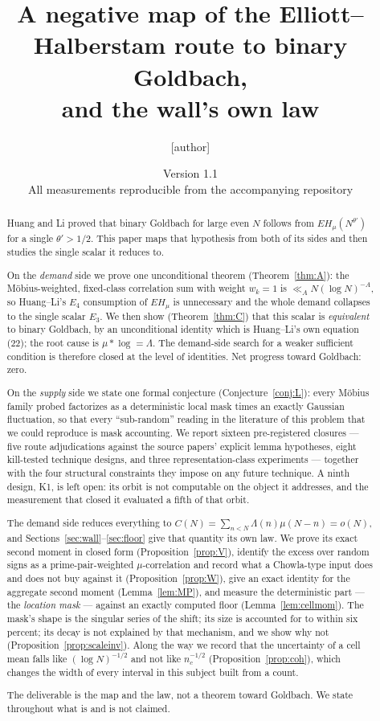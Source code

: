\documentclass[11pt,a4paper]{article}
\title{A negative map of the Elliott--Halberstam route to binary
Goldbach,\\ and the wall's own law}
\author{[author]}
\date{Version 1.1\\
\small All measurements reproducible from the accompanying repository}
\theoremstyle{plain}
\theoremstyle{definition}
\begin{document}
\maketitle

\begin{abstract}
Huang and Li proved that binary Goldbach for large even $N$ follows
from $EH_\mu(N^{\theta'})$ for a single $\theta' > 1/2$. This paper
maps that hypothesis from both of its sides and then studies the
single scalar it reduces to.

On the \emph{demand} side we prove one unconditional theorem
(Theorem~\ref{thm:A}): the M\"obius-weighted, fixed-class correlation
sum with weight $w_k = 1$ is $\ll_A N(\log N)^{-A}$, so Huang--Li's
$E_4$ consumption of $EH_\mu$ is unnecessary and the whole demand
collapses to the single scalar $E_3$. We then show
(Theorem~\ref{thm:C}) that this scalar is \emph{equivalent} to binary
Goldbach, by an unconditional identity which is Huang--Li's own
equation (22); the root cause is $\mu * \log = \Lambda$. The
demand-side search for a weaker sufficient condition is therefore
closed at the level of identities. Net progress toward Goldbach: zero.

On the \emph{supply} side we state one formal conjecture
(Conjecture~\ref{conj:L}): every M\"obius family probed factorizes as
a deterministic local mask times an exactly Gaussian fluctuation, so
that every ``sub-random'' reading in the literature of this problem
that we could reproduce is mask accounting. We report sixteen
pre-registered closures --- five route adjudications against the
source papers' explicit lemma hypotheses, eight kill-tested technique
designs, and three representation-class experiments --- together with
the four structural constraints they impose on any future technique. A
ninth design, K1, is left open: its orbit is not computable on the
object it addresses, and the measurement that closed it evaluated a
fifth of that orbit.

The demand side reduces everything to
$C(N)=\sum_{n<N}\Lambda(n)\mu(N-n) = o(N)$, and
Sections~\ref{sec:wall}--\ref{sec:floor} give that quantity its own
law. We prove its exact second moment in closed form
(Proposition~\ref{prop:V}), identify the excess over random signs as a
prime-pair-weighted $\mu$-correlation and record what a Chowla-type
input does and does not buy against it (Proposition~\ref{prop:W}),
give an exact identity for the aggregate second moment
(Lemma~\ref{lem:MP}), and measure the deterministic part --- the
\emph{location mask} --- against an exactly computed floor
(Lemma~\ref{lem:cellmom}). The mask's shape is the singular series of
the shift; its size is accounted for to within six percent; its decay
is not explained by that mechanism, and we show why not
(Proposition~\ref{prop:scaleinv}). Along the way we record that the
uncertainty of a cell mean falls like $(\log N)^{-1/2}$ and not like
$n_c^{-1/2}$ (Proposition~\ref{prop:coh}), which changes the width of
every interval in this subject built from a count.

The deliverable is the map and the law, not a theorem toward Goldbach.
We state throughout what is and is not claimed.
\end{abstract}
\end{document}
